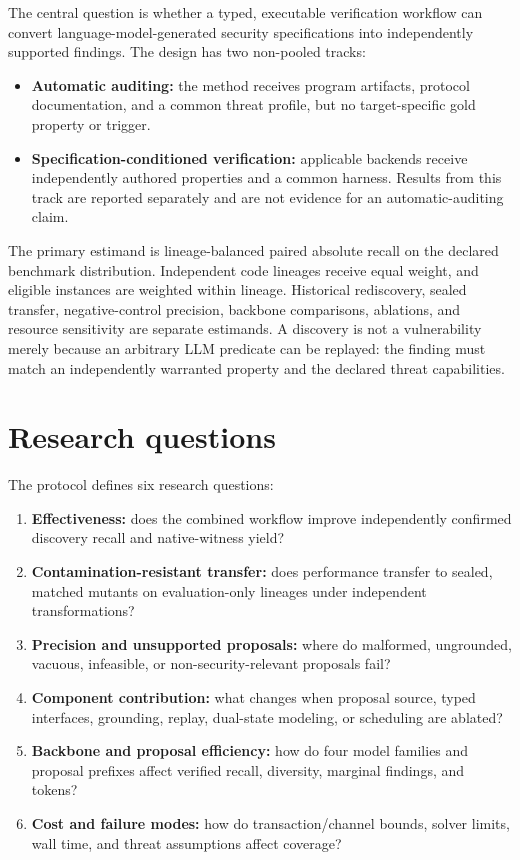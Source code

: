 \documentclass[11pt,a4paper]{article}
\begin{document}
The central question is whether a typed, executable verification workflow can convert language-model-generated security specifications into independently supported findings. The design has two non-pooled tracks:

\begin{itemize}
  \item \textbf{Automatic auditing:} the method receives program artifacts, protocol documentation, and a common threat profile, but no target-specific gold property or trigger.
  \item \textbf{Specification-conditioned verification:} applicable backends receive independently authored properties and a common harness. Results from this track are reported separately and are not evidence for an automatic-auditing claim.
\end{itemize}

The primary estimand is lineage-balanced paired absolute recall on the declared benchmark distribution. Independent code lineages receive equal weight, and eligible instances are weighted within lineage. Historical rediscovery, sealed transfer, negative-control precision, backbone comparisons, ablations, and resource sensitivity are separate estimands. A discovery is not a vulnerability merely because an arbitrary LLM predicate can be replayed: the finding must match an independently warranted property and the declared threat capabilities.

\section{Research questions}

The protocol defines six research questions:

\begin{enumerate}
  \item \textbf{Effectiveness:} does the combined workflow improve independently confirmed discovery recall and native-witness yield?
  \item \textbf{Contamination-resistant transfer:} does performance transfer to sealed, matched mutants on evaluation-only lineages under independent transformations?
  \item \textbf{Precision and unsupported proposals:} where do malformed, ungrounded, vacuous, infeasible, or non-security-relevant proposals fail?
  \item \textbf{Component contribution:} what changes when proposal source, typed interfaces, grounding, replay, dual-state modeling, or scheduling are ablated?
  \item \textbf{Backbone and proposal efficiency:} how do four model families and proposal prefixes affect verified recall, diversity, marginal findings, and tokens?
  \item \textbf{Cost and failure modes:} how do transaction/channel bounds, solver limits, wall time, and threat assumptions affect coverage?
\end{enumerate}
\end{document}
